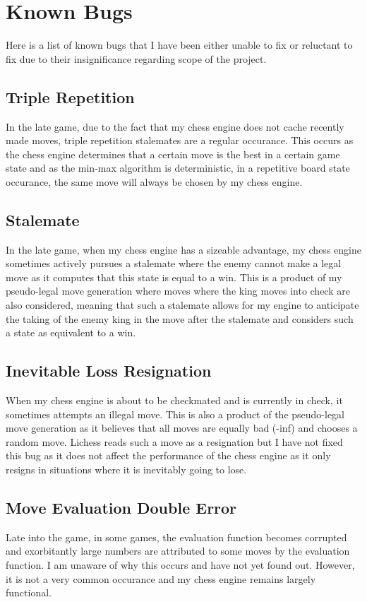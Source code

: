 \chapter{Known Bugs}
Here is a list of known bugs that I have been either unable to fix or reluctant to fix due to their insignificance regarding scope of the project.
\section{Triple Repetition}
In the late game, due to the fact that my chess engine does not cache recently made moves, triple repetition stalemates are a regular occurance. This occurs as the chess engine determines that a certain move is the best in a certain game state and as the min-max algorithm is deterministic, in a repetitive board state occurance, the same move will always be chosen by my chess engine.
\section{Stalemate}
In the late game, when my chess engine has a sizeable advantage, my chess engine sometimes actively pursues a stalemate where the enemy cannot make a legal move as it computes that this state is equal to a win. This is a product of my pseudo-legal move generation where moves where the king moves into check are also considered, meaning that such a stalemate allows for my engine to anticipate the taking of the enemy king in the move after the stalemate and considers such a state as equivalent to a win.
\section{Inevitable Loss Resignation}
When my chess engine is about to be checkmated and is currently in check, it sometimes attempts an illegal move. This is also a product of the pseudo-legal move generation as it believes that all moves are equally bad (-inf) and chooses a random move. Lichess reads such a move as a resignation but I have not fixed this bug as it does not affect the performance of the chess engine as it only resigns in situations where it is inevitably going to lose.
\section{Move Evaluation Double Error}
Late into the game, in some games, the evaluation function becomes corrupted and exorbitantly large numbers are attributed to some moves by the evaluation function. I am unaware of why this occurs and have not yet found out. However, it is not a very common occurance and my chess engine remains largely functional.
